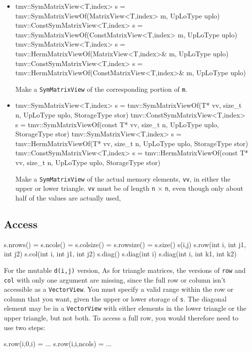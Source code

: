 \documentclass[twoside,letterpaper,11pt]{article}
\renewcommand{\tt}[1]{{\lstinline {#1}}}
\begin{document}
\begin{itemize}
\item
\begin{tmvcode}
tmv::SymMatrixView<T,index> s = 
      tmv::SymMatrixViewOf(MatrixView<T,index> m, UpLoType uplo)
tmv::ConstSymMatrixView<T,index> s = 
      tmv::SymMatrixViewOf(ConstMatrixView<T,index> m, UpLoType uplo)
tmv::SymMatrixView<T,index> s = 
      tmv::HermMatrixViewOf(MatrixView<T,index>& m, UpLoType uplo)
tmv::ConstSymMatrixView<T,index> s = 
      tmv::HermMatrixViewOf(ConstMatrixView<T,index>& m, UpLoType uplo)
\end{tmvcode}
Make a \tt{SymMatrixView} of the corresponding portion of \tt{m}.

\item
\begin{tmvcode}
tmv::SymMatrixView<T,index> s = 
      tmv::SymMatrixViewOf(T* vv, size_t n, UpLoType uplo, 
      StorageType stor)
tmv::ConstSymMatrixView<T,index> s =
      tmv::SymMatrixViewOf(const T* vv, size_t n, UpLoType uplo, 
      StorageType stor)
tmv::SymMatrixView<T,index> s =
      tmv::HermMatrixViewOf(T* vv, size_t n, UpLoType uplo, 
      StorageType stor)
tmv::ConstSymMatrixView<T,index> s =
      tmv::HermMatrixViewOf(const T* vv, size_t n, UpLoType uplo, 
      StorageType stor)
\end{tmvcode}
Make a \tt{SymMatrixView} of the actual memory elements, \tt{vv}, in either the 
upper or lower triangle.
\tt{vv} must be of length \tt{n} $\times$ \tt{n}, even though only about half 
of the values are actually used,

\end{itemize}

\subsection{Access}
\label{SymMatrix_Access}

\begin{tmvcode}
s.nrows() = s.ncols() = s.colsize() = s.rowsize() = s.size()
s(i,j)
s.row(int i, int j1, int j2)
s.col(int i, int j1, int j2)
s.diag()
s.diag(int i)
s.diag(int i, int k1, int k2)
\end{tmvcode}
For the mutable \tt{d(i,j)} version, 
As for triangle matrices, the versions of \tt{row} and \tt{col} with only one argument are
missing, since the full row or column isn't accessible as a \tt{VectorView}.
You must specify a valid range within the row or column that you want, 
given the upper or lower storage of \tt{s}.
The diagonal element may be in a \tt{VectorView} with either elements in the 
lower triangle or the upper triangle, but not both.  To access a full row, you would 
therefore need to use two steps:
\begin{tmvcode}
s.row(i,0,i) = ...
s.row(i,i,ncols) = ...
\end{tmvcode}
\end{document}
